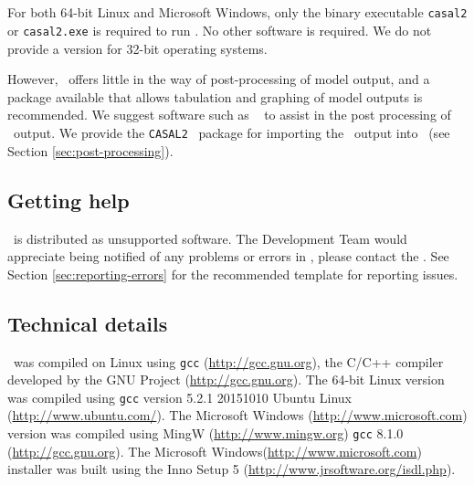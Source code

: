 \subsection{}

For both 64-bit Linux and Microsoft Windows, only the binary executable \texttt{casal2} or \texttt{casal2.exe} is required to run \CNAME . No other software is required. We do not provide a version for 32-bit operating systems. 

However, \CNAME\ offers little in the way of post-processing of model output, and a package available that allows tabulation and graphing of model outputs is recommended. We suggest software such as \href{http://www.r-project.org}{\R}\ \citep{R} to assist in the post processing of \CNAME\ output. We provide the \texttt{CASAL2} \R\ package for importing the \CNAME\ output into \R\ (see Section \ref{sec:post-processing}).

\subsection{Getting help}

\CNAME\ is distributed as unsupported software. The Development Team would appreciate being notified of any problems or errors in \CNAME , please contact the \emaillink . See Section \ref{sec:reporting-errors} for the recommended template for reporting issues.

\subsection{Technical details}\label{sec:tech}

\CNAME\ was compiled on Linux using \texttt{gcc} (\url{http://gcc.gnu.org}), the C/C++ compiler developed by the GNU Project (\url{http://gcc.gnu.org}). The 64-bit Linux  version was compiled using \texttt{gcc} version 5.2.1 20151010 Ubuntu Linux (\url{http://www.ubuntu.com/}). The Microsoft Windows (\url{http://www.microsoft.com}) version was compiled using MingW (\url{http://www.mingw.org}) \texttt{gcc} 8.1.0 (\url{http://gcc.gnu.org}). The Microsoft Windows(\url{http://www.microsoft.com}) installer was built using the Inno Setup 5 (\url{http://www.jrsoftware.org/isdl.php}).

